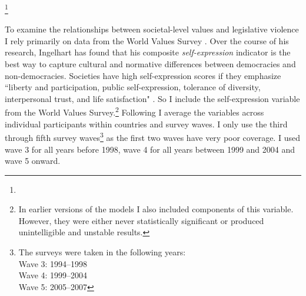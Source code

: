 \documentclass[a4paper]{article}\usepackage[]{graphicx}\usepackage[]{color}
\begin{document}
 \citeyearpar{Henisz2004}\footnote{}  \citep{Themner2014}

To examine the relationships between societal-level values and legislative violence I rely primarily on data from the World Values Survey \citeyearpar{WVS2009}. Over the course of his research, Ingelhart has found that his composite {\emph{self-expression}} indicator is the best way to capture cultural and normative differences between democracies and non-democracies. Societies have high self-expression scores if they emphasize ``liberty and participation, public self-expression, tolerance of diversity, interpersonal trust, and life satisfaction" \citep[64]{Inglehart2003}. So I include the self-expression variable from the World Values Survey.\footnote{In earlier versions of the models I also included components of this variable. However, they were either never statistically significant or produced unintelligible and unstable results.} Following \cite{Inglehart2003} I average the variables across individual participants within countries and survey waves. I only use the third through fifth survey waves\footnote{The surveys were taken in the following years: \\ Wave 3: 1994--1998 \\ Wave 4: 1999--2004 \\ Wave 5: 2005--2007} as the first two waves have very poor coverage. I used wave 3 for all years before 1998, wave 4 for all years between 1999 and 2004 and wave 5 onward.
\end{document}
